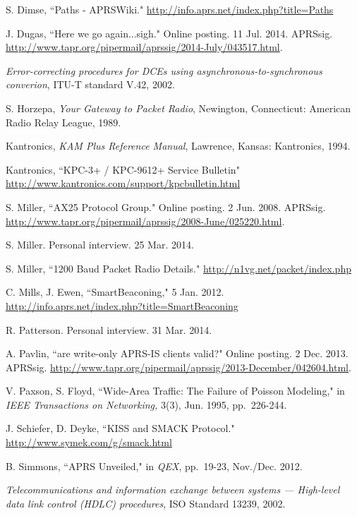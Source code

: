 \begin{thebibliography}{99}
		S. Dimse, ``Paths - APRSWiki."
		\url{http://info.aprs.net/index.php?title=Paths}

		J. Dugas,
		``Here we go again...sigh."
		Online posting. 11 Jul. 2014. APRSsig.
		\url{http://www.tapr.org/pipermail/aprssig/2014-July/043517.html}.

		\emph{Error-correcting procedures for DCEs using 
		asynchronous-to-synchronous converion}, ITU-T standard V.42, 2002.

		S. Horzepa,
		\emph{Your Gateway to Packet Radio},
		Newington, Connecticut: American Radio Relay League, 1989.

		Kantronics,
		\emph{KAM Plus Reference Manual},
		Lawrence, Kansas: Kantronics, 1994.

		Kantronics, ``KPC-3+ / KPC-9612+ Service Bulletin"
		\url{http://www.kantronics.com/support/kpcbulletin.html}

		S. Miller,
		``AX25 Protocol Group."
		Online posting. 2 Jun. 2008. APRSsig.
		\url{http://www.tapr.org/pipermail/aprssig/2008-June/025220.html}.

		S. Miller. Personal interview. 25 Mar. 2014.

		S. Miller,
		``1200 Baud Packet Radio Details."
		\url{http://n1vg.net/packet/index.php}

		C. Mills, J. Ewen,
		``SmartBeaconing,"
		5 Jan. 2012.
		\url{http://info.aprs.net/index.php?title=SmartBeaconing}

		R. Patterson. Personal interview. 31 Mar. 2014.

		A. Pavlin,
		``are write-only APRS-IS clients valid?"
		Online posting. 2 Dec. 2013. APRSsig.
		\url{http://www.tapr.org/pipermail/aprssig/2013-December/042604.html}.

		V. Paxson, S. Floyd,
		``Wide-Area Traffic: The Failure of Poisson Modeling," in
		\emph{IEEE Transactions on Networking,}
		3(3), Jun. 1995, pp.~226-244.

		J. Schiefer, D. Deyke,
		``KISS and SMACK Protocol."
		\url{http://www.symek.com/g/smack.html}

		B. Simmons,
		``APRS Unveiled," in \emph{QEX},
		pp.~19-23,
		Nov./Dec. 2012.

		\emph{Telecommunications and information
			exchange between systems --- High-level data link control (HDLC)
		procedures}, ISO Standard 13239, 2002.


\end{thebibliography}
